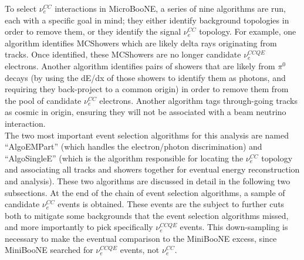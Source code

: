 To select $\nu_e^{CC}$ interactions in MicroBooNE, a series of nine algorithms are run, each with a specific goal in mind; they either identify background topologies in order to remove them, or they identify the signal $\nu_e^{CC}$ topology. For example, one algorithm identifies {\sc MCShowers} which are likely delta rays originating from tracks. Once identified, these {\sc MCShowers} are no longer candidate $\nu_e^{CCQE}$ electrons. Another algorithm identifies pairs of showers that are likely from $\pi^0$ decays (by using the dE/dx of those showers to identify them as photons, and requiring they back-project to a common origin) in order to remove them from the pool of candidate $\nu_e^{CC}$ electrons. Another algorithm tags through-going tracks as cosmic in origin, ensuring they will not be associated with a beam neutrino interaction.\\

The two most important event selection algorithms for this analysis are named ``AlgoEMPart'' (which handles the electron/photon discrimination) and ``AlgoSingleE'' (which is the algorithm responsible for locating the $\nu_e^{CC}$ topology and associating all tracks and showers together for eventual energy reconstruction and analysis). These two algorithms are discussed in detail in the following two subsections. At the end of the chain of event selection algorithms, a sample of candidate $\nu_e^{CC}$ events is obtained. These events are the subject to further cuts both to mitigate some backgrounds that the event selection algorithms missed, and more importantly to pick specifically $\nu_e^{CCQE}$ events. This down-sampling is necessary to make the eventual comparison to the MiniBooNE excess, since MiniBooNE searched for $\nu_e^{CCQE}$ events, not $\nu_e^{CC}$.


